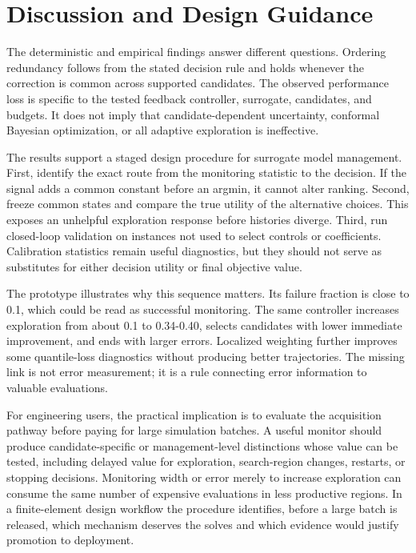 \documentclass[]{interact}
\begin{document}
\hypertarget{discussion-and-design-guidance}{%
\section{Discussion and Design Guidance}\label{discussion-and-design-guidance}}

The deterministic and empirical findings answer different questions. Ordering redundancy follows from the stated decision rule and holds whenever the correction is common across supported candidates. The observed performance loss is specific to the tested feedback controller, surrogate, candidates, and budgets. It does not imply that candidate-dependent uncertainty, conformal Bayesian optimization, or all adaptive exploration is ineffective.

The results support a staged design procedure for surrogate model management. First, identify the exact route from the monitoring statistic to the decision. If the signal adds a common constant before an argmin, it cannot alter ranking. Second, freeze common states and compare the true utility of the alternative choices. This exposes an unhelpful exploration response before histories diverge. Third, run closed-loop validation on instances not used to select controls or coefficients. Calibration statistics remain useful diagnostics, but they should not serve as substitutes for either decision utility or final objective value.

The prototype illustrates why this sequence matters. Its failure fraction is close to 0.1, which could be read as successful monitoring. The same controller increases exploration from about 0.1 to 0.34-0.40, selects candidates with lower immediate improvement, and ends with larger errors. Localized weighting further improves some quantile-loss diagnostics without producing better trajectories. The missing link is not error measurement; it is a rule connecting error information to valuable evaluations.

For engineering users, the practical implication is to evaluate the acquisition pathway before paying for large simulation batches. A useful monitor should produce candidate-specific or management-level distinctions whose value can be tested, including delayed value for exploration, search-region changes, restarts, or stopping decisions. Monitoring width or error merely to increase exploration can consume the same number of expensive evaluations in less productive regions. In a finite-element design workflow the procedure identifies, before a large batch is released, which mechanism deserves the solves and which evidence would justify promotion to deployment.
\end{document}
